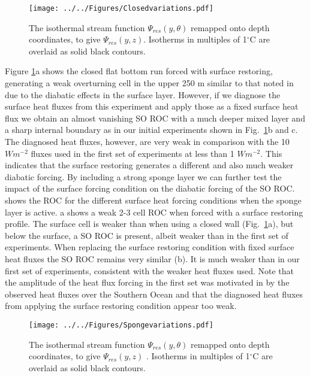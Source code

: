 \begin{figure}
\center
\noindent \texttt{[image: ../../Figures/Closedvariations.pdf]} 
\caption{The isothermal stream function $\Psi_{res}(y,\theta)$ remapped onto depth coordinates, to give $\Psi_{res}(y,z)$. Isotherms in multiples of 1$^{\circ}$C are overlaid as solid black contours.}
\label{fig:Closedvariations}
\end{figure}
Figure \ref{fig:Closedvariations}a shows the closed flat bottom run forced with surface restoring, generating a weak overturning cell in the upper 250 m similar to that noted in \citet{Abernathey2014} due to the diabatic effects in the surface layer. However, if we diagnose the surface heat fluxes from this experiment and apply those as a fixed surface heat flux we obtain an almost vanishing SO ROC with a much deeper mixed layer and a sharp internal boundary as in our initial experiments shown in Fig.~\ref{fig:Closedvariations}b and c. The diagnosed heat fluxes, however, are very weak in comparison with the 10 $Wm^{-2}$ fluxes used in the first set of experiments at less than 1 $Wm^{-2}$. This indicates that the surface restoring generates a different and also much weaker diabatic forcing. By including a strong sponge layer we can further test the impact of the surface forcing condition on the diabatic forcing of the SO ROC.  shows the ROC for the different surface heat forcing conditions when the sponge layer is active.  a shows a weak 2-3 cell ROC when forced with a surface restoring profile. The surface cell is weaker than when using a closed wall (Fig.~\ref{fig:Closedvariations}a), but below the surface, a SO ROC is present, albeit weaker than in the first set of experiments. When replacing the surface restoring condition with fixed surface heat fluxes the SO ROC remains very similar (b). It is much weaker than in our first set of experiments, consistent with the weaker heat fluxes used. Note that the amplitude of the heat flux forcing in the first set was motivated in \cite{Abernathey2011} by the observed heat fluxes over the Southern Ocean and that the diagnosed heat fluxes from applying the surface restoring condition appear too weak. 

\begin{figure}[H]
\center
\noindent \texttt{[image: ../../Figures/Spongevariations.pdf]} 
\caption{The isothermal stream function $\Psi_{res}(y,\theta)$ remapped onto depth coordinates, to give $\Psi_{res}(y,z)$ . Isotherms in multiples of 1$^{\circ}$C are overlaid as solid black contours.}
\label{fig:Spongevariations}
\end{figure}

